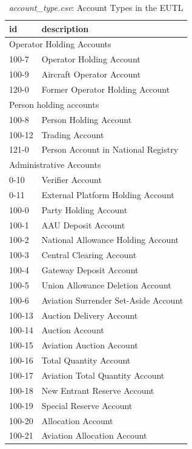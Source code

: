 \documentclass[authoryear]{elsarticle}
\begin{document}
\begin{table}[htbp]\scriptsize
	\caption{\textit{account\_type.csv}: Account Types in the EUTL}\label{tab:accountTypes}
	\centering
	\begin{tabular*}{\textwidth}{@{}@{\extracolsep{\fill}} ll @{}}
		\toprule
		\toprule
		\textbf{id} & \textbf{description}  \\
		\midrule
		\multicolumn{2}{l}{Operator Holding Accounts} \\
		\midrule
		100-7 & Operator Holding Account \\
		100-9 & Aircraft Operator Account \\
		120-0 & Former Operator Holding Account \\
		\midrule
		\multicolumn{2}{l}{Person holding accounts} \\
		\midrule
		100-8 & Person Holding Account \\
		100-12 & Trading Account \\
		121-0 & Person Account in National Registry \\
		\midrule
		\multicolumn{2}{l}{Administrative Accounts} \\
		\midrule
		0-10  & Verifier Account \\
		0-11  & External Platform Holding Account \\
		100-0 & Party Holding Account \\
		100-1 & AAU Deposit Account \\
		100-2 & National Allowance Holding Account \\
		100-3 & Central Clearing Account \\
		100-4 & Gateway Deposit Account \\
		100-5 & Union Allowance Deletion Account \\
		100-6 & Aviation Surrender Set-Aside Account \\
		100-13 & Auction Delivery Account \\
		100-14 & Auction Account \\
		100-15 & Aviation Auction Account \\
		100-16 & Total Quantity Account \\
		100-17 & Aviation Total Quantity Account \\
		100-18 & New Entrant Reserve Account \\
		100-19 & Special Reserve Account \\
		100-20 & Allocation Account \\
		100-21 & Aviation Allocation Account \\

\end{tabular*}
\end{table}
\end{document}

